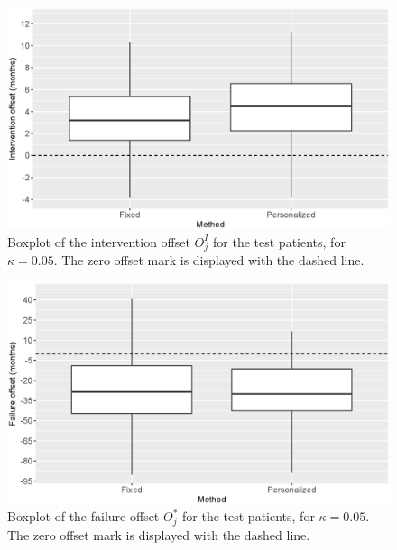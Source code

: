 \begin{figure}[!htb]
\centerline{\includegraphics[width=\columnwidth]{images/truethrestimept05.eps}}
\caption{Boxplot of the intervention offset $O^I_j$ for the test patients, for $\kappa = 0.05$. The zero offset mark is displayed with the dashed line.}
\label{fig : truethrestimept05}
\end{figure}

\begin{figure}[!htb]
\centerline{\includegraphics[width=\columnwidth]{images/truestoptimept05.eps}}
\caption{Boxplot of the failure offset $O^*_j$ for the test patients, for $\kappa = 0.05$. The zero offset mark is displayed with the dashed line.}
\label{fig : truestoptimept05}
\end{figure}



